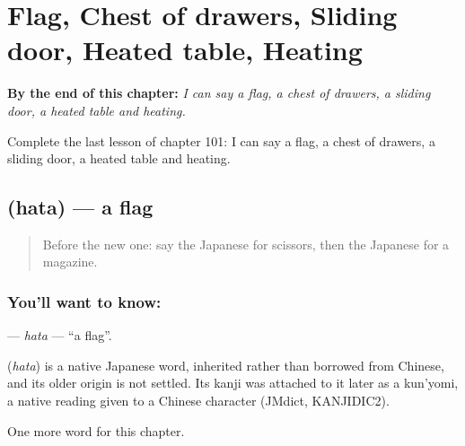 
\chapter{Flag, Chest of drawers, Sliding door, Heated table, Heating}
\label{ch:ja-flag-chest-of-drawers-sliding-door-heated-table-heating}

\begin{chapteropening}
\textbf{By the end of this chapter:} \emph{I can say a flag, a chest of drawers, a sliding door, a heated table and heating.}

Complete the last lesson of chapter 101: I can say a flag, a chest of drawers, a sliding door, a heated table and heating.
\end{chapteropening}

\section[\texorpdfstring{\ja{はた} (hata)}{はた (hata)}]{ (hata) — a flag}

\label{lesson:JA-C101-hata}



\begin{quote}
Before the new one: say the Japanese for scissors, then the Japanese for a magazine.
\end{quote}

\subsection*{You'll want to know: }
\textbf{} — \emph{hata} — \textquotedblleft{}a flag\textquotedblright{}.

\begin{cousinweb}
\textbf{} (\emph{hata}) is a native Japanese word, inherited rather than borrowed from Chinese, and its older origin is not settled. Its kanji was attached to it later as a kun'yomi, a native reading given to a Chinese character (JMdict, KANJIDIC2).
\end{cousinweb}

\begin{grammarlens}[title={What you've built}]
One more word for this chapter.
\end{grammarlens}

